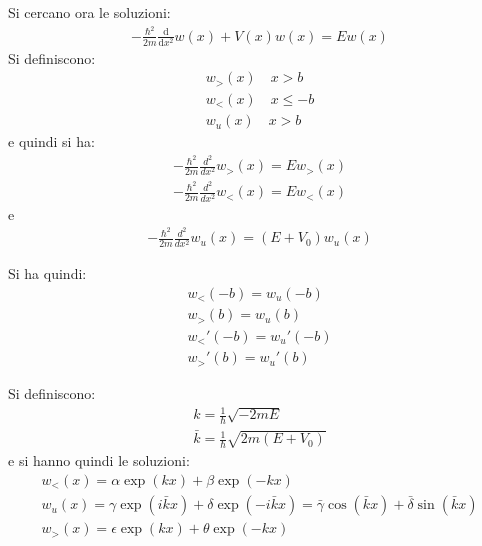 Si cercano ora le soluzioni:
\begin{equation}\begin{split}
-\frac{\hbar ^2}{2m}\frac{\textrm{d}}{\textrm{d}x^2}w\left(x\right)+V\left(x\right)w\left(x\right)=Ew\left(x\right)
\end{split}\end{equation}
Si definiscono:
\begin{equation}\begin{split}
w_{>}\left(x\right) \quad x>b\\
w_{<}\left(x\right) \quad  x\le -b\\
w_{u}\left(x\right) \quad x>b
\end{split}\end{equation}
e quindi si ha:
\begin{equation}\begin{split}
-\frac{\hbar ^2}{2m}\frac{d^2}{dx^2}w_>\left(x\right)=Ew_{>}\left(x\right) \\
-\frac{\hbar ^2}{2m}\frac{d^2}{dx^2}w_<\left(x\right)=Ew_{<}\left(x\right) 
\end{split}\end{equation}
e
\begin{equation}\begin{split}
-\frac{\hbar ^2}{2m}\frac{d^2}{dx^2}w_u\left(x\right)=\left(E+V_0\right)w_{u}\left(x\right)
\end{split}\end{equation}

Si ha quindi:
\begin{equation}\begin{split}
w_<\left(-b\right)=w_u\left(-b\right) \\
w_>\left(b\right)=w_u\left(b\right) \\
w_<'\left(-b\right)=w_u'\left(-b\right) \\
w_>'\left(b\right)=w_u'\left(b\right) 
\end{split}\end{equation}

Si definiscono:
\begin{equation}\begin{split}
k=\frac{1}{\hbar }\sqrt{-2mE} \\
\bar k=\frac{1}{\hbar }\sqrt{2m\left(E+V_0\right)}
\end{split}\end{equation}
e si hanno quindi le soluzioni:
\begin{equation}\begin{split}
w_<\left(x\right)=\alpha\exp{\left(kx\right)}+\beta\exp{\left(-kx\right)} \\
w_u\left(x\right)=\gamma\exp{\left(i\bar kx\right)}+\delta\exp{\left(-i\bar kx\right)}=\bar \gamma\cos{\left(\bar kx\right)}+\bar \delta\sin{\left(\bar kx\right)} \\
w_>\left(x\right)=\epsilon\exp{\left(kx\right)}+\theta\exp{\left(-kx\right)}
\end{split}\end{equation}


